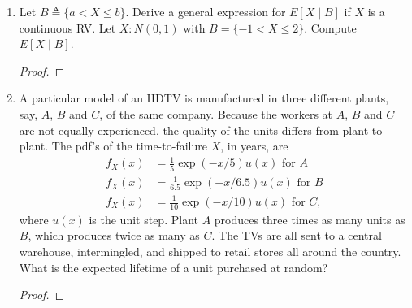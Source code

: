 \documentclass[paper=usletter, fontsize=12pt]{article}
\begin{document}
\begin{enumerate}
\begin{enumerate}
\begin{proof}
                \begin{align*}
                    P(W_m) & = \int_{0}^{1}P(W_m \mid X=x)f_X(x)\diff{x}\\
                    & = \int_{0}^{1}\binom{n}{m}x^m(1-x)^{n-m}f_X(x)\diff{x}\\
                    & = \binom{n}{m}\frac{m!(n-m)!}{(n+1)!}  \qedhere
                \end{align*}
                \endgroup

            \end{proof}

        \end{enumerate}

        \item Let $B \triangleq \{a < X \le b\}$. Derive a general expression
        for $E[X \mid B]$ if $X$ is a continuous RV. Let $X : N(0,1)$ with
        $B=\{-1 < X \le 2\}$. Compute $E[X \mid B]$.
        \begin{proof}
        \end{proof}

        \item A particular model of an HDTV is manufactured in three different
        plants, say, $A$, $B$ and $C$, of the same company. Because the workers
        at $A$, $B$ and $C$ are not equally experienced, the quality of the
        units differs from plant to plant. The pdf's of the time-to-failure
        $X$, in years, are
        \begin{align*}
            f_X(x) &= \frac{1}{5}\exp(-x/5)u(x) \text{ for } A\\
            f_X(x) &= \frac{1}{6.5}\exp(-x/6.5)u(x) \text{ for } B\\
            f_X(x) &= \frac{1}{10}\exp(-x/10)u(x) \text{ for } C,
        \end{align*}
        \endgroup
        where $u(x)$ is the unit step. Plant $A$ produces three times as many
        units as $B$, which produces twice as many as $C$. The TVs are all sent
        to a central warehouse, intermingled, and shipped to retail stores all
        around the country. What is the expected lifetime of a unit purchased
        at random?
        \begin{proof}


\end{proof}
\end{enumerate}
\end{document}
